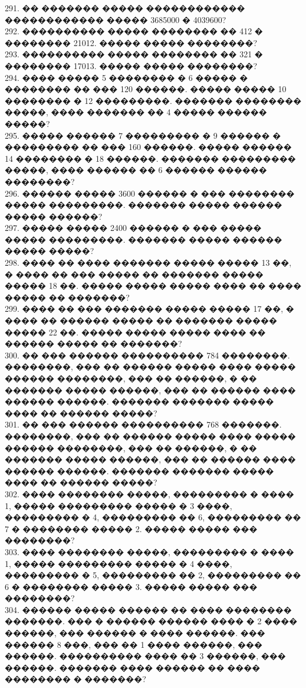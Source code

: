 \documentclass[12pt]{article}
\begin{document}
291. �� ������� ����� ������������ ������������ ����� 3685000 � 4039600?\\
292. ���������� ����� �������� �� 412 � �������� 21012. ����� ����� ��������?\\
293. ���������� ����� �������� �� 321 � �������� 17013. ����� ����� ��������?\\
294. ���� ����� 5 �������� � 6 ����� � �������� �� ��� 120 ������. ����� ����� 10 �������� � 12 ���������. ������� �������� �����, ���� ������� �� 4 ����� ������ �����?\\
295. ����� ������ 7 ��������� � 9 ������ � ��������� �� ��� 160 ������. ����� ������ 14 �������� � 18 ������. ������� ��������� �����, ���� ������ �� 6 ������ ������ ��������?\\
296. ������ ����� 3600 ������ � ��� �������� ����� ���������. ������� ����� ������ ����� ������?\\
297. ����� ����� 2400 ������ � ��� ����� ����� ���������. ������� ����� ������ ����� �����?\\
298. ���� �� ���� ������� ����� ����� 13 ��, � ���� �� ��� ����� �� ������� ����� ����� 18 ��. ����� ����� ����� ���� �� ���� ����� �� �������?\\
299. ���� �� ��� ������� ����� ����� 17 ��, � ���� �� ������ ����� �� ������� ����� ����� 22 ��. ����� ����� ����� ���� �� ������ ����� �� �������?\\
300. �� ��� ������ ���������� 784 ��������. ��������, ��� �� ������ ����� ���� ����� ������ ��������, ��� �� ������, � �� ������� ����� ������, ��� �� ������ ���� ������ ������. ������� ������� ����� ���� �� ������ �����?\\
301. �� ��� ������ ���������� 768 �������. ��������, ��� �� ������ ����� ���� ����� ������ ��������, ��� �� ������, � �� ������� ����� ������, ��� �� ������ ���� ������ ������. ������� ������� ����� ���� �� ������ �����?\\
302. ���� �������� �����, ��������� � ���� 1, ����� ��������� ����� � 3 ����, ��������� � 4, ��������� �� 6, ��������� �� 7 � �������� ����� 2. ����� ����� ��� ��������?\\
303. ���� �������� �����, ��������� � ���� 1, ����� ��������� ����� � 4 ����, ��������� � 5, ��������� �� 2, ��������� �� 6 � �������� ����� 3. ����� ����� ��� ��������?\\
304. ������ ����� ������ �� ���� �������� �������. ��� � ������ ������ ���� � 2 ���� ������, ��� ������ � ���� ������. ��� ������ 8 ���, ��� �� 1 ���� ������, ��� ������. ���������� ���� �� 3 ������, ��� ������. ������� ���� ������ �� ���� �������� � �������?\\
\end{document}
